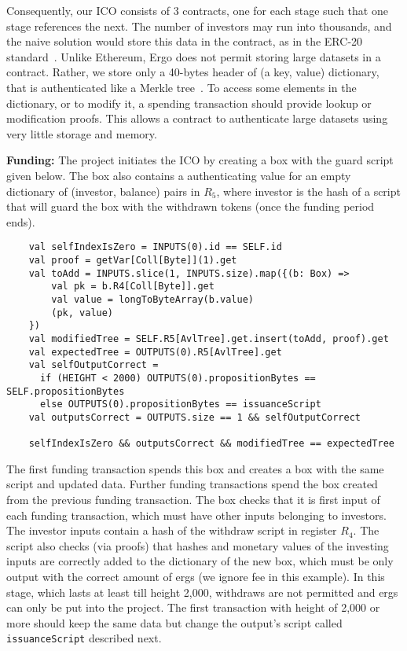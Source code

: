 \documentclass[runningheads]{llncs}
\begin{document}
Consequently, our ICO consists of 3 contracts, one for each stage such that one stage references the next. 
The number of investors may run into thousands, and the naive solution would store this data in the contract, as in the ERC-20 standard~\cite{erc20}. 
Unlike Ethereum, Ergo does not permit storing large datasets in a contract. Rather, we store only a 40-bytes header of (a key, value) dictionary, that is authenticated like a Merkle tree~\cite{RMCI17}. To access some elements in the dictionary, or to modify it, a spending transaction should provide lookup or modification proofs. This allows a contract to authenticate large datasets using very little storage and memory. 

\textbf{Funding:} 
The project initiates the ICO by creating a box with the guard script given below. The box also contains a authenticating value for an empty dictionary of (investor, balance) pairs in $R_5$, where investor is the hash of a script that will guard the box with the withdrawn tokens (once the funding period ends). 

\small{\begin{verbatim}
	val selfIndexIsZero = INPUTS(0).id == SELF.id
	val proof = getVar[Coll[Byte]](1).get
	val toAdd = INPUTS.slice(1, INPUTS.size).map({(b: Box) =>
	    val pk = b.R4[Coll[Byte]].get
	    val value = longToByteArray(b.value)
	    (pk, value)
	})
	val modifiedTree = SELF.R5[AvlTree].get.insert(toAdd, proof).get
	val expectedTree = OUTPUTS(0).R5[AvlTree].get
	val selfOutputCorrect = 
	  if (HEIGHT < 2000) OUTPUTS(0).propositionBytes == SELF.propositionBytes
	  else OUTPUTS(0).propositionBytes == issuanceScript 
	val outputsCorrect = OUTPUTS.size == 1 && selfOutputCorrect
	
	selfIndexIsZero && outputsCorrect && modifiedTree == expectedTree
	\end{verbatim}
}

The first funding transaction spends this box and creates a box with the same script and updated data. Further funding transactions spend the box created from the previous funding transaction. The box checks that it is first input of each funding transaction, which must have other inputs belonging to investors. The investor inputs contain a hash of the withdraw script in register $R_4$. 
The script also checks (via proofs) that hashes and monetary values of the investing inputs are correctly added to the dictionary of the new box, which must be only output with the correct amount of ergs (we ignore fee in this example). 
In this stage, which lasts at least till height 2,000, withdraws are not permitted and ergs can only be put into the project. 
The first transaction with height of 2,000 or more should keep the same data but change the output's script called \texttt{issuanceScript} described next.
\end{document}
